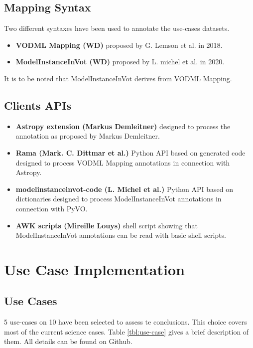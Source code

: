 \documentclass[11pt,a4paper]{ivoa}
\begin{document}
\subsection{Mapping Syntax}

Two different syntaxes have been used to annotate the use-cases datasets.

\begin{itemize}
\item \textbf{VODML Mapping (WD)} proposed by G. Lemson et al. in 2018.
\item \textbf{ModelInstanceInVot (WD)} proposed by L. michel et al. in 2020.
\end{itemize}

It is to be noted that ModelInstanceInVot derives from VODML Mapping.

\subsection{Clients APIs}

\begin{itemize}
\item \textbf{Astropy extension (Markus Demleitner)}  designed to process the annotation as proposed by Markus Demleitner.
\item \textbf{Rama (Mark. C. Dittmar et al.)} Python API based on generated code designed to process  VODML Mapping annotations in connection with Astropy.
\item \textbf{modelinstanceinvot-code (L. Michel et al.)} Python API based on dictionaries designed to process ModelInstanceInVot annotations in connection with PyVO.
\item \textbf{AWK scripts (Mireille Louys)} shell script showing that ModelInstanceInVot annotations  can be read with basic shell scripts.
\end{itemize}


\section{Use Case Implementation}
\subsection{Use Cases}

5 use-cases on 10 have been selected to assess te conclusions. This choice covers most of the current science cases. 
Table \ref{tbl:use-case} gives a brief description of them. All details can be found on Github.
\end{document}
